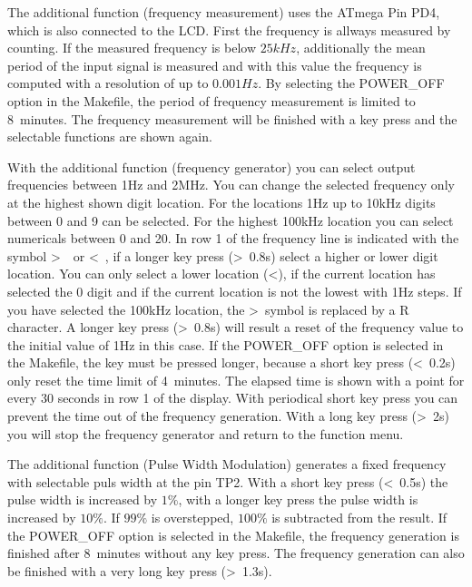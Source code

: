\begin{description} \setlength{\itemsep}{0em}
 \item[frequency]
 The additional function  (frequency measurement) uses the ATmega Pin PD4, which is also connected to the LCD.
First the frequency is allways measured by counting.
If the measured frequency is below \(25kHz\), additionally the mean period of the input signal
is measured and with this value the frequency is computed with a resolution of up to \(0.001Hz\).
By selecting the POWER\_OFF option in the Makefile, the period of frequency measurement is limited to 8~minutes.
The frequency measurement will be finished with a key press and the selectable functions are shown again.\\

 \item[f-Generator]
 With the additional function  (frequency generator) you can select output frequencies between 1Hz and 2MHz.
You can change the selected frequency only at the highest shown digit location. 
For the locations 1Hz up to 10kHz digits between 0 and 9 can be selected.
For the highest 100kHz location you can select numericals between 0 and 20.
In row 1 of the frequency line is indicated with the symbol \textgreater~~or \textless~, 
if a longer key press (\textgreater~0.8s) select a higher or lower digit location.
You can only select a lower location (\textless), if the current location has selected the 0 digit and 
if the current location is not the lowest with 1Hz steps.
If you have selected the 100kHz location, the \textgreater~symbol is replaced by a R character. 
A longer key press (\textgreater~0.8s) will result a reset of the frequency value to the initial value of 1Hz in this case.
If the POWER\_OFF option is selected in the Makefile, the key must be pressed longer, because a
short key press (\textless~0.2s) only reset the time limit of 4~minutes.
The elapsed time is shown with a point for every 30 seconds in row 1 of the display.
With periodical short key press you can prevent the time out of the frequency generation.
With a long key press (\textgreater~2s) you will stop the frequency generator and return to the function menu.\\

\item[10-bit PWM]
The additional function  (Pulse Width Modulation) generates a fixed frequency with selectable
puls width at the pin TP2.
With a short key press (\textless~0.5s) the pulse width is increased by \(1\%\), with a longer key press the pulse width
is increased by \(10\%\).
If \(99\%\) is overstepped, \(100\%\) is subtracted from the result.
If the POWER\_OFF option is selected in the Makefile, the frequency generation is finished after 8~minutes without any key press.
The frequency generation can also be finished with a very long key press (\textgreater~1.3s).\\


\end{description}
